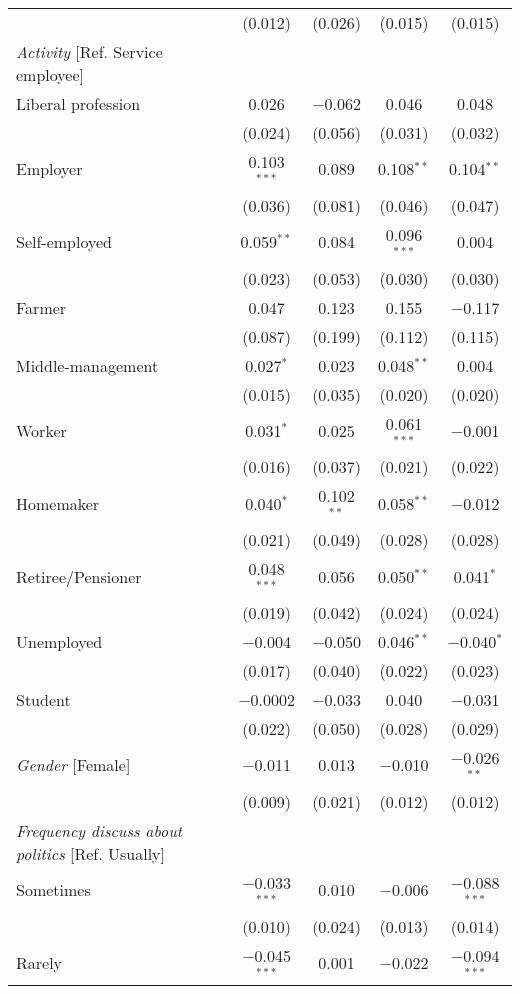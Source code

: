 \documentclass[12pt,a4paper]{article}
\begin{document}
\begin{scriptsize}
\begin{longtable}{lcccc}
    & (0.012) & (0.026) & (0.015) & (0.015) \\ 
{\it Activity} [Ref. Service employee]\\
Liberal profession   & 0.026 & $-$0.062 & 0.046 & 0.048 \\ 
    & (0.024) & (0.056) & (0.031) & (0.032) \\ 
Employer   & 0.103$^{***}$ & 0.089 & 0.108$^{**}$ & 0.104$^{**}$ \\ 
  & (0.036) & (0.081) & (0.046) & (0.047) \\ 
Self-employed   & 0.059$^{**}$ & 0.084 & 0.096$^{***}$ & 0.004 \\ 
    & (0.023) & (0.053) & (0.030) & (0.030) \\ 
Farmer   & 0.047 & 0.123 & 0.155 & $-$0.117 \\ 
    & (0.087) & (0.199) & (0.112) & (0.115) \\ 
Middle-management  & 0.027$^{*}$ & 0.023 & 0.048$^{**}$ & 0.004 \\ 
   & (0.015) & (0.035) & (0.020) & (0.020) \\ 
Worker   & 0.031$^{*}$ & 0.025 & 0.061$^{***}$ & $-$0.001 \\ 
    & (0.016) & (0.037) & (0.021) & (0.022) \\ 
Homemaker   & 0.040$^{*}$ & 0.102$^{**}$ & 0.058$^{**}$ & $-$0.012 \\ 
    & (0.021) & (0.049) & (0.028) & (0.028) \\ 
Retiree/Pensioner   & 0.048$^{***}$ & 0.056 & 0.050$^{**}$ & 0.041$^{*}$ \\ 
    & (0.019) & (0.042) & (0.024) & (0.024) \\ 
Unemployed   & $-$0.004 & $-$0.050 & 0.046$^{**}$ & $-$0.040$^{*}$ \\ 
  & (0.017) & (0.040) & (0.022) & (0.023) \\ 
Student   & $-$0.0002 & $-$0.033 & 0.040 & $-$0.031 \\ 
    & (0.022) & (0.050) & (0.028) & (0.029) \\ 
{\it Gender} [Female]    & $-$0.011 & 0.013 & $-$0.010 & $-$0.026$^{**}$ \\ 
    & (0.009) & (0.021) & (0.012) & (0.012) \\ 
{\it Frequency discuss about politics} [Ref. Usually]\\
Sometimes   & $-$0.033$^{***}$ & 0.010 & $-$0.006 & $-$0.088$^{***}$ \\ 
    & (0.010) & (0.024) & (0.013) & (0.014) \\ 
Rarely   & $-$0.045$^{***}$ & 0.001 & $-$0.022 & $-$0.094$^{***}$ \\ 

\end{longtable}
\end{scriptsize}
\end{document}
